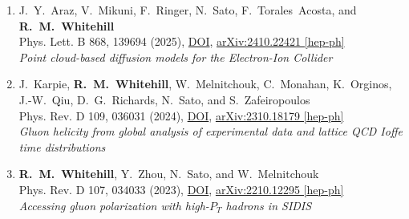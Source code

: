 \begin{enumerate}[leftmargin=*]
    \item J.~Y.~Araz, V.~Mikuni, F.~Ringer, N.~Sato, F.~Torales~Acosta, and \textbf{R.~M.~Whitehill} \\
    Phys. Lett. B 868, 139694 (2025), \href{https://doi.org/10.1016/j.physletb.2025.139694}{DOI}, \href{https://arxiv.org/abs/2410.22421}{arXiv:2410.22421 [hep-ph]} \\
    \textit{Point cloud-based diffusion models for the Electron-Ion Collider}

    \item J.~Karpie, \textbf{R.~M.~Whitehill}, W.~Melnitchouk, C.~Monahan, K.~Orginos, J.-W.~Qiu, D.~G.~Richards, N.~Sato, and S.~Zafeiropoulos \\
    Phys. Rev. D 109, 036031 (2024), \href{https://doi.org/10.1103/PhysRevD.109.036031}{DOI}, \href{https://arxiv.org/abs/2310.18179}{arXiv:2310.18179 [hep-ph]} \\
    \textit{Gluon helicity from global analysis of experimental data and lattice QCD Ioffe time distributions}

    \item \textbf{R.~M.~Whitehill}, Y.~Zhou, N.~Sato, and W.~Melnitchouk \\
    Phys. Rev. D 107, 034033 (2023), \href{https://doi.org/10.1103/PhysRevD.107.034033}{DOI}, \href{https://arxiv.org/abs/2210.12295}{arXiv:2210.12295 [hep-ph]} \\
    \textit{Accessing gluon polarization with high-$P_T$ hadrons in SIDIS}
\end{enumerate}
